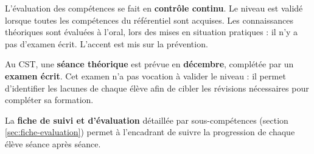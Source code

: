 L'évaluation des compétences se fait en \textbf{contrôle continu}. Le niveau est validé
lorsque toutes les compétences du référentiel sont acquises. Les connaissances théoriques sont
évaluées à l'oral, lors des mises en situation pratiques : il n'y a pas d'examen écrit.
L'accent est mis sur la prévention.

Au CST, une \textbf{séance théorique} est prévue en \textbf{décembre}, complétée par un
\textbf{examen écrit}. Cet examen n'a pas vocation à valider le niveau : il permet
d'identifier les lacunes de chaque élève afin de cibler les révisions nécessaires pour
compléter sa formation.

La \textbf{fiche de suivi et d'évaluation} détaillée par sous-compétences (section
\ref{sec:fiche-evaluation}) permet à l'encadrant de suivre la progression de chaque élève
séance après séance.
